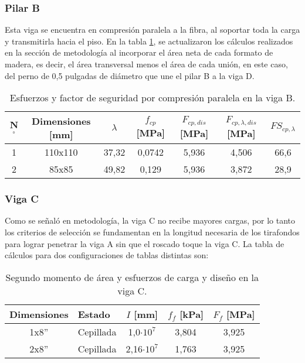\subsubsection{Pilar B}
Esta viga se encuentra en compresión paralela a la fibra, al soportar toda la carga y transmitirla hacia el piso. En la tabla \ref{tab:res_viga_b}, se actualizaron los cálculos realizados en la sección de metodología al incorporar el área neta de cada formato de madera, es decir, el área transversal menos el área de cada unión, en este caso, del perno de 0,5 pulgadas de diámetro que une el pilar B a la viga D.

\begin{table}[h]
\centering
\begin{tabular}{@{}ccccccc@{}}
\toprule
N$^{\circ}$ & Dimensiones [mm] & $\lambda$ & $f_{cp}$ [MPa] & $F_{cp,dis}$ [MPa] & $F_{cp,\lambda,dis}$ [MPa] & $FS_{cp,\lambda}$ \\ \midrule
1 & 110x110 & 37,32 & 0,0742 & 5,936 & 4,506 & 66,6 \\
2 & 85x85 & 49,82 & 0,129 & 5,936 & 3,872 & 28,9 \\ \bottomrule
\end{tabular}
\caption{Esfuerzos y factor de seguridad por compresión paralela en la viga B.}
\label{tab:res_viga_b}
\end{table}

\subsubsection{Viga C}
Como se señaló en metodología, la viga C no recibe mayores cargas, por lo tanto los criterios de selección se fundamentan en la longitud necesaria de los tirafondos para lograr penetrar la viga A sin que el roscado toque la viga C. La tabla de cálculos para dos configuraciones de tablas distintas son:

\begin{table}[h]
\centering
\begin{tabular}{@{}clccc@{}}
\toprule
Dimensiones & Estado & $I$ [mm] & $f_f$ [kPa] & $F_f$ [MPa] \\ \midrule
1x8'' & Cepillada & 1,0$\cdot 10^7$ & 3,804 & 3,925 \\
2x8'' & Cepillada & 2,16$\cdot 10^7$ & 1,763 & 3,925 \\ \bottomrule
\end{tabular}
\caption{Segundo momento de área y esfuerzos de carga y diseño en la viga C.}
\label{tab:res_viga_c}
\end{table}

